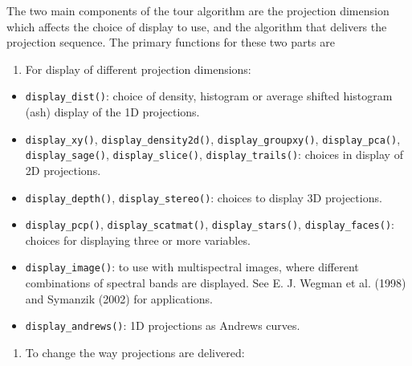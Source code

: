 \documentclass[
  letterpaper,
]{krantz}
\providecommand{\tightlist}{%
  \setlength{\itemsep}{0pt}\setlength{\parskip}{0pt}}
\begin{document}
The two main components of the tour algorithm are the projection
dimension which affects the choice of display to use, and the algorithm
that delivers the projection sequence. The primary functions for these
two parts are

\begin{enumerate}
\def\labelenumi{\arabic{enumi}.}
\tightlist
\item
  For display of different projection dimensions:
\end{enumerate}

\begin{itemize}
\tightlist
\item
  \texttt{display\_dist()}: choice of density, histogram or average
  shifted histogram (ash) display of the 1D projections.
\item
  \texttt{display\_xy()}, \texttt{display\_density2d()},
  \texttt{display\_groupxy()}, \texttt{display\_pca()},
  \texttt{display\_sage()}, \texttt{display\_slice()},
  \texttt{display\_trails()}: choices in display of 2D projections.
\item
  \texttt{display\_depth()}, \texttt{display\_stereo()}: choices to
  display 3D projections.
\item
  \texttt{display\_pcp()}, \texttt{display\_scatmat()},
  \texttt{display\_stars()}, \texttt{display\_faces()}: choices for
  displaying three or more variables.
\item
  \texttt{display\_image()}: to use with multispectral images, where
  different combinations of spectral bands are displayed. See E. J.
  Wegman et al. (1998) and Symanzik (2002) for applications.
\item
  \texttt{display\_andrews()}: 1D projections as Andrews curves.
\end{itemize}

\begin{enumerate}
\def\labelenumi{\arabic{enumi}.}
\setcounter{enumi}{1}
\tightlist
\item
  To change the way projections are delivered:
\end{enumerate}
\end{document}
